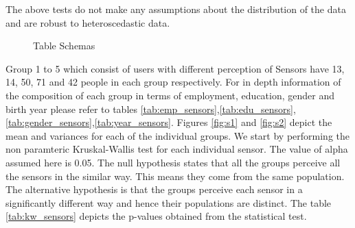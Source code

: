 The above tests do not make any assumptions about the distribution of the data and are robust to heteroscedastic data.
\begin{figure}[htp]
\caption{Table Schemas}
\label{fig:s3}
\end{figure}

Group 1 to 5 which consist of users with different perception of Sensors have 13, 14, 50, 71 and 42 people in each group respectively. For in depth information of the composition of each group in terms of employment, education, gender and birth year please refer to tables
\ref{tab:emp_sensors},\ref{tab:edu_sensors},\ref{tab:gender_sensors},\ref{tab:year_sensors}. Figures \ref{fig:s1} and \ref{fig:s2} depict the mean and variances for each of the individual groups. We start by performing the non paramteric Kruskal-Wallis test for each individual sensor. The value of alpha assumed here is 0.05. The null hypothesis states that all the groups perceive all the sensors in the similar way. This means they come from the same population. The alternative hypothesis is
that the groups perceive each sensor in a significantly different way and hence their populations are distinct. The table \ref{tab:kw_sensors} depicts the p-values obtained from the statistical test.

